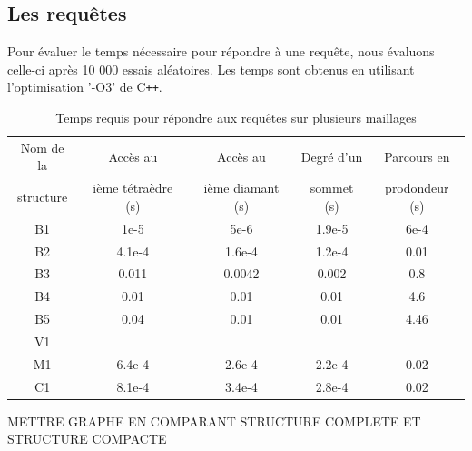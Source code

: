 \subsection{Les requêtes}
\noindent
Pour évaluer le temps nécessaire pour répondre à une requête, nous évaluons celle-ci après 10 000 essais aléatoires. Les temps sont obtenus en utilisant l'optimisation '-O3' de C\texttt{++}.
\begin{table}[h]
\footnotesize
\centering
\begin{tabular}{| c | c | c| c |c |}
\hline
Nom de la & Accès au& Accès au & Degré d'un & Parcours en\\
structure &ième tétraèdre (s)& ième diamant (s) &sommet (s)&prodondeur (s)\\
\hline
B1  & 1e-5 & 5e-6 & 1.9e-5 & 6e-4\\
B2  &  4.1e-4 & 1.6e-4 & 1.2e-4 & 0.01\\
B3 & 0.011 & 0.0042 & 0.002 & 0.8\\
B4 & 0.01 & 0.01 & 0.01 & 4.6\\
B5 & 0.04 & 0.01 & 0.01 & 4.46 \\
V1 & & & & \\
M1  & 6.4e-4 & 2.6e-4 & 2.2e-4 & 0.02\\
C1  & 8.1e-4 & 3.4e-4 & 2.8e-4 & 0.02\\
\hline  
\end{tabular}
\label{table:results_time}
\caption{Temps requis pour répondre aux requêtes sur plusieurs maillages}
\end{table}
\noindent


METTRE GRAPHE EN COMPARANT STRUCTURE COMPLETE ET STRUCTURE COMPACTE